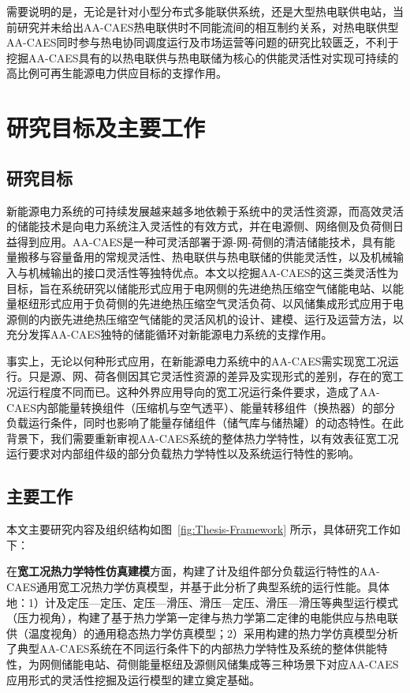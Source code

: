 需要说明的是，无论是针对小型分布式多能联供系统，还是大型热电联供电站，当前研究并未给出AA-CAES热电联供时不同能流间的相互制约关系，对热电联供型AA-CAES同时参与热电协同调度运行及市场运营等问题的研究比较匮乏\cite{CAES-Review-18-Rui-operation}，不利于挖掘AA-CAES具有的以热电联供与热电联储为核心的供能灵活性对实现可持续的高比例可再生能源电力供应目标的支撑作用。

\section{研究目标及主要工作}
\label{sec:mind-work}
\subsection{研究目标}
新能源电力系统的可持续发展越来越多地依赖于系统中的灵活性资源，而高效灵活的储能技术是向电力系统注入灵活性的有效方式，并在电源侧、网络侧及负荷侧日益得到应用。AA-CAES是一种可灵活部署于源-网-荷侧的清洁储能技术，具有能量搬移与容量备用的常规灵活性、热电联供与热电联储的供能灵活性，以及机械输入与机械输出的接口灵活性等独特优点。本文以挖掘AA-CAES的这三类灵活性为目标，旨在系统研究以储能形式应用于电网侧的先进绝热压缩空气储能电站、以能量枢纽形式应用于负荷侧的先进绝热压缩空气灵活负荷、以风储集成形式应用于电源侧的内嵌先进绝热压缩空气储能的灵活风机的设计、建模、运行及运营方法，以充分发挥AA-CAES独特的储能循环对新能源电力系统的支撑作用。

事实上，无论以何种形式应用，在新能源电力系统中的AA-CAES需实现宽工况运行。只是源、网、荷各侧因其它灵活性资源的差异及实现形式的差别，存在的宽工况运行程度不同而已。这种外界应用导向的宽工况运行条件要求，造成了AA-CAES内部能量转换组件（压缩机与空气透平）、能量转移组件（换热器）的部分负载运行条件，同时也影响了能量存储组件（储气库与储热罐）的动态特性。在此背景下，我们需要重新审视AA-CAES系统的整体热力学特性，以有效表征宽工况运行要求对内部组件级的部分负载热力学特性以及系统运行特性的影响。

\subsection{主要工作}

本文主要研究内容及组织结构如图~\ref{fig:Thesis-Framework} 所示，具体研究工作如下：

在\textbf{宽工况热力学特性仿真建模}方面，构建了计及组件部分负载运行特性的AA-CAES通用宽工况热力学仿真模型，并基于此分析了典型系统的运行性能。具体地：1）计及定压—定压、定压—滑压、滑压—定压、滑压—滑压等典型运行模式（压力视角），构建了基于热力学第一定律与热力学第二定律的电能供应与热电联供（温度视角）的通用稳态热力学仿真模型；2）采用构建的热力学仿真模型分析了典型AA-CAES系统在不同运行条件下的内部热力学特性及系统的整体供能特性，为网侧储能电站、荷侧能量枢纽及源侧风储集成等三种场景下对应AA-CAES应用形式的灵活性挖掘及运行模型的建立奠定基础。

